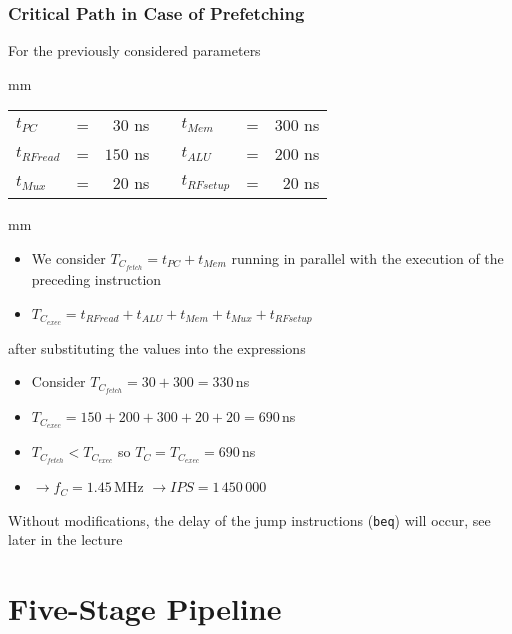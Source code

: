 \documentclass{beamer}
\begin{document}
\begin{frame}
\frametitle{Critical Path in Case of Prefetching}

For the previously considered parameters

 mm

\begin{tabular}{l c r m{1 cm} l c r}
$t_{PC}$ & = & $30$ ns & & $t_{Mem}$ & = & $300$ ns \\
$t_{RFread}$ & = & $150$ ns  & & $t_{ALU}$ & = & $200$ ns \\
$t_{Mux}$ & = & $20$ ns  & & $t_{RFsetup}$ & = & $20$ ns \\
\end{tabular}

 mm

\begin{itemize}
 \item We consider $T_{C_{fetch}} = t_{PC} + t_{Mem}$ running in parallel with the execution of the preceding instruction
 \item $T_{C_{exec}} = t_{RFread} + t_{ALU} + t_{Mem} + t_{Mux} + t_{RFsetup}$
\end{itemize}

after substituting the values into the expressions

\begin{itemize}
 \item Consider $T_{C_{fetch}} = 30 + 300 = 330$\,ns
 \item $T_{C_{exec}} = 150 + 200 + 300 + 20 + 20 = 690$\,ns
 \item $T_{C_{fetch}} < T_{C_{exec}}$ so $T_{C} = T_{C_{exec}} = 690$\,ns
 \item $\rightarrow f_{C} = 1.45$\,MHz $\rightarrow IPS = 1\,450\,000$
\end{itemize}

Without modifications, the delay of the jump instructions (\texttt{beq}) will occur, see later in the lecture

\end{frame}

\section{Five-Stage Pipeline}
\end{document}

